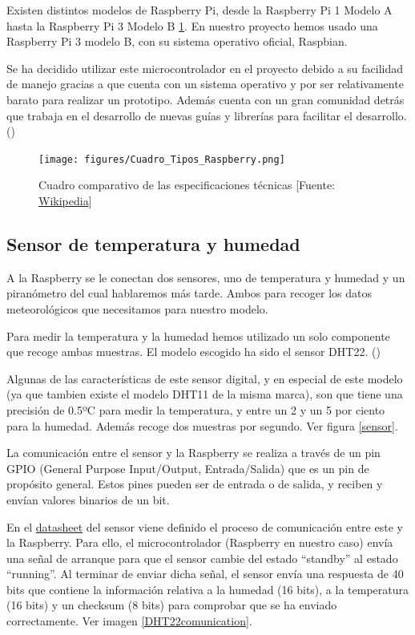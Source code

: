 Existen distintos modelos de Raspberry Pi, desde la Raspberry Pi 1 Modelo A hasta la Raspberry Pi 3 Modelo B \ref{types}.
En nuestro proyecto hemos usado una Raspberry Pi 3 modelo B, con su sistema operativo oficial, Raspbian.

Se ha decidido utilizar este microcontrolador en el proyecto debido a su facilidad de manejo gracias a que cuenta con un sistema operativo y por ser relativamente barato para realizar un prototipo. Además cuenta con un gran comunidad detrás que trabaja en el desarrollo de nuevas guías y librerías para facilitar el desarrollo. (\cite{ARP:RaspberryPi:2017})

\begin{figure}[htb]
	\begin{center}
		\texttt{[image: figures/Cuadro\_Tipos\_Raspberry.png]}
		\caption{Cuadro comparativo de las especificaciones técnicas [Fuente: \href{www.wikipedia.org}{Wikipedia}]\label{types}}
	\end{center}
\end{figure}

\subsection{Sensor de temperatura y humedad}
\label{makereference2.2.2}

A la Raspberry se le conectan dos sensores, uno de temperatura y humedad y un piranómetro del cual hablaremos más tarde. Ambos para recoger los datos meteorológicos que necesitamos para nuestro modelo.

Para medir la temperatura y la humedad hemos utilizado un solo componente que recoge ambas muestras. El modelo escogido ha sido el sensor DHT22. (\cite{ARP:Adafruit:2017})

Algunas de las características de este sensor digital, y en especial de este modelo (ya que tambien existe el modelo DHT11 de la misma marca), son que tiene una precisión de 0.5ºC para medir la temperatura, y entre un 2 y un 5 por ciento para la humedad. Además recoge dos muestras por segundo. Ver figura \ref{sensor}.

La comunicación entre el sensor y la Raspberry se realiza a través de un pin GPIO (General Purpose Input/Output, Entrada/Salida) que es un pin de propósito general. Estos pines pueden ser de entrada o de salida, y reciben y envían valores binarios de un bit.

En el \href{https://cdn-shop.adafruit.com/datasheets/Digital+humidity+and+temperature+sensor+AM2302.pdf}{datasheet} del sensor viene definido el proceso de comunicación entre este y la Raspberry. Para ello, el microcontrolador (Raspberry en nuestro caso) envía una señal de arranque para que el sensor cambie del estado ``standby'' al estado ``running''. Al terminar de enviar dicha señal, el sensor envía una respuesta de 40 bits que contiene la información relativa a la humedad (16 bits), a la temperatura (16 bits) y un checksum (8 bits) para comprobar que se ha enviado correctamente. Ver imagen \ref{DHT22comunication}.

